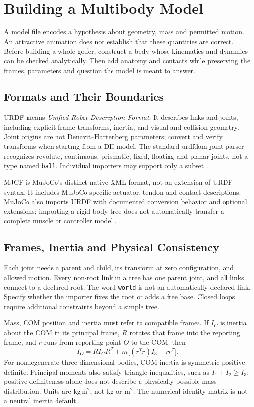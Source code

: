 \chapter{Building a Multibody Model}
\label{ch:building-models}

A model file encodes a hypothesis about geometry, mass and permitted motion.
An attractive animation does not establish that these quantities are correct.
Before building a whole golfer, construct a body whose kinematics and dynamics
can be checked analytically. Then add anatomy and contacts while preserving
the frames, parameters and question the model is meant to answer.

\section{Formats and Their Boundaries}

URDF means \emph{Unified Robot Description Format}. It describes links and
joints, including explicit frame transforms, inertia, and visual and collision
geometry. Joint origins are not Denavit--Hartenberg parameters; convert and
verify transforms when starting from a DH model. The standard urdfdom joint
parser recognizes revolute, continuous, prismatic, fixed, floating and planar
joints, not a type named \texttt{ball}. Individual importers may support only
a subset \cite{URDFPhysicalReview,URDFJointParserReview}.

MJCF is MuJoCo's distinct native XML format, not an extension of URDF syntax.
It includes MuJoCo-specific actuator, tendon and contact descriptions. MuJoCo
also imports URDF with documented conversion behavior and optional extensions;
importing a rigid-body tree does not automatically transfer a complete muscle
or controller model \cite{MuJoCoModelingReview}.

\section{Frames, Inertia and Physical Consistency}

Each joint needs a parent and child, its transform at zero configuration, and
allowed motion. Every non-root link in a tree has one parent joint, and all
links connect to a declared root. The word \texttt{world} is not an automatically
declared link. Specify whether the importer fixes the root or adds a free base.
Closed loops require additional constraints beyond a simple tree.

Mass, COM position and inertia must refer to compatible frames. If $I_C$ is
inertia about the COM in its principal frame, $R$ rotates that frame into the
reporting frame, and $r$ runs from reporting point $O$ to the COM, then
\begin{equation}
 I_O=R I_C R^T+m\big[(r^Tr)I_3-rr^T\big].
\end{equation}
For nondegenerate three-dimensional bodies, COM inertia is symmetric positive
definite. Principal moments also satisfy triangle inequalities, such as
$I_1+I_2\geq I_3$; positive definiteness alone does not describe a physically
possible mass distribution. Units are kg\,m$^2$, not kg or m$^2$. The numerical
identity matrix is not a neutral inertia default.

